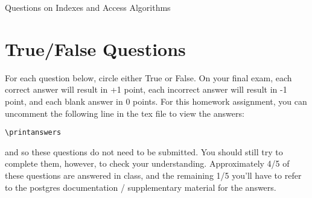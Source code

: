 \documentclass{exam}
\theoremstyle{definition}
\begin{document}
\begin{center}
\Huge
Questions on Indexes and Access Algorithms
\end{center}


\section{True/False Questions}

For each question below, circle either True or False.
On your final exam,
each correct answer will result in +1 point,
each incorrect answer will result in -1 point,
and each blank answer in 0 points.
For this homework assignment, you can uncomment the following line in the tex file to view the answers:
\begin{verbatim}
\printanswers
\end{verbatim}
and so these questions do not need to be submitted.
You should still try to complete them, however, to check your understanding.
Approximately 4/5 of these questions are answered in class,
and the remaining 1/5 you'll have to refer to the postgres documentation / supplementary material for the answers.
\end{document}
